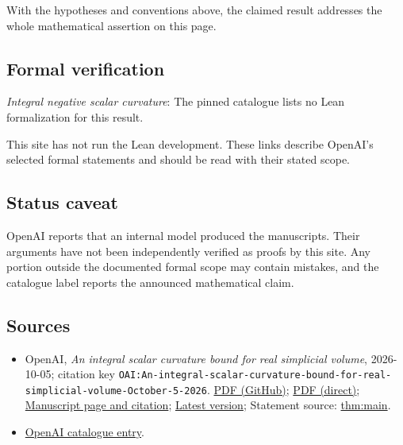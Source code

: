 \documentclass[11pt]{article}
\begin{document}
With the hypotheses and conventions above, the claimed result addresses the whole mathematical assertion on this page.

\subsection{Formal verification}
\textit{Integral negative scalar curvature}: The pinned catalogue lists no Lean formalization for this result.

This site has not run the Lean development. These links describe OpenAI’s selected formal statements and should be read with their stated scope.

\subsection{Status caveat}
OpenAI reports that an internal model produced the manuscripts. Their arguments have not been independently verified as proofs by this site. Any portion outside the documented formal scope may contain mistakes, and the catalogue label reports the announced mathematical claim.

\subsection{Sources}
\begin{itemize}
\item OpenAI, \emph{An integral scalar curvature bound for real simplicial volume}, 2026-10-05; citation key \texttt{OAI:An-integral-scalar-curvature-bound-for-real-simplicial-volume-October-5-2026}. \href{https://github.com/openai/math/blob/adc7f1241b42e322a6451854ab7e4b4c146bf78a/preprints/An-integral-scalar-curvature-bound-for-real-simplicial-volume-October-5-2026/v126-proof.pdf}{PDF (GitHub)}; \href{https://github.com/openai/math/raw/adc7f1241b42e322a6451854ab7e4b4c146bf78a/preprints/An-integral-scalar-curvature-bound-for-real-simplicial-volume-October-5-2026/v126-proof.pdf}{PDF (direct)}; \href{https://github.com/openai/math/blob/adc7f1241b42e322a6451854ab7e4b4c146bf78a/preprints/An-integral-scalar-curvature-bound-for-real-simplicial-volume-October-5-2026/README.md}{Manuscript page and citation}; \href{https://github.com/openai/math/blob/main/preprints/An-integral-scalar-curvature-bound-for-real-simplicial-volume-October-5-2026/v126-proof.pdf}{Latest version}; Statement source: \href{https://github.com/openai/math/blob/adc7f1241b42e322a6451854ab7e4b4c146bf78a/preprints/An-integral-scalar-curvature-bound-for-real-simplicial-volume-October-5-2026/build/sections/01-introduction.tex\#L67}{thm:main}.
\item \href{https://github.com/openai/math/blob/adc7f1241b42e322a6451854ab7e4b4c146bf78a/CONTENTS.md}{OpenAI catalogue entry}.
\end{itemize}
\end{document}
